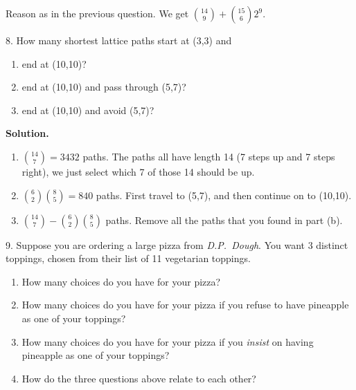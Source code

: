 \documentclass[10pt,]{book}
\theoremstyle{plain}
\theoremstyle{definition}
\theoremstyle{definition}
\theoremstyle{definition}
\numberwithin{equation}{section}
\begin{document}
\begin{exerciselist}
            Reason as in the previous question. We get \({14\choose 9} + {15 \choose 6}2^9\).
\item[8.]\hypertarget{exercise-57}{}
            How many shortest lattice paths start at (3,3) and
\leavevmode%
\begin{enumerate}[label=(\alph*)]
\item\hypertarget{li-444}{} end at (10,10)? %
\item\hypertarget{li-445}{} end at (10,10) and pass through (5,7)? %
\item\hypertarget{li-446}{} end at (10,10) and avoid (5,7)? %
\end{enumerate}
\par\smallskip
\par\smallskip
\noindent\textbf{Solution.}\hypertarget{solution-83}{}\quad
\leavevmode%
\begin{enumerate}[label=(\alph*)]
\item\hypertarget{li-447}{}\({14 \choose 7} = 3432\) paths.  The paths all have length 14 (7 steps up and 7 steps right), we just select which 7 of those 14 should be up.%
\item\hypertarget{li-448}{}\({6 \choose 2}{8\choose 5} = 840\) paths.  First travel to (5,7), and then continue on to (10,10).%
\item\hypertarget{li-449}{}\({14 \choose 7} - {6\choose 2}{8 \choose 5}\) paths.  Remove all the paths that you found in part (b).%
\end{enumerate}
\item[9.]\hypertarget{exercise-58}{}
            Suppose you are ordering a large pizza from \emph{D.P.~Dough}. You want 3 distinct toppings, chosen from their list of 11 vegetarian toppings.
\leavevmode%
\begin{enumerate}[label=(\alph*)]
\item\hypertarget{li-450}{} How many choices do you have for your pizza? %
\item\hypertarget{li-451}{} How many choices do you have for your pizza if you refuse to have pineapple as one of your toppings? %
\item\hypertarget{li-452}{} How many choices do you have for your pizza if you \emph{insist} on having pineapple as one of your toppings? %
\item\hypertarget{li-453}{} How do the three questions above relate to each other? %
\end{enumerate}
\par\smallskip
\par\smallskip

\end{exerciselist}
\end{document}
